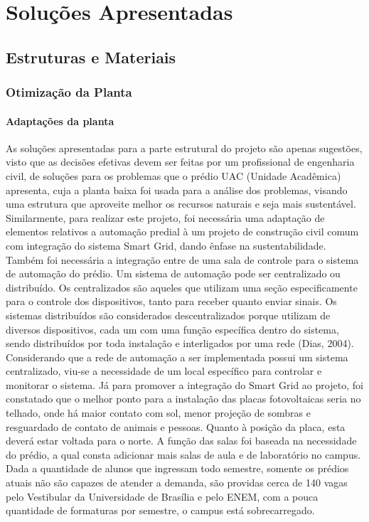 \part{Soluções Apresentadas}
\label{sol}
\chapter[Estruturas e Materiais]{Estruturas e Materiais}

\section{Otimização da Planta}
\subsection{Adaptações da planta}
As soluções apresentadas para a parte estrutural do projeto são apenas sugestões, visto que as decisões efetivas devem ser feitas por um profissional de engenharia civil, de soluções para os problemas que o prédio UAC (Unidade Acadêmica) apresenta, cuja a planta baixa foi usada para a análise dos problemas, visando uma estrutura que aproveite melhor os recursos naturais e seja mais sustentável.
Similarmente, para realizar este projeto, foi necessária uma adaptação de elementos relativos a automação predial à um projeto de construção civil comum com integração do sistema Smart Grid, dando ênfase na sustentabilidade. Também foi necessária a integração entre de uma sala de controle para o sistema de automação do prédio.
Um sistema de automação pode ser centralizado ou distribuído. Os centralizados são aqueles que utilizam uma seção especificamente para o controle dos dispositivos, tanto para receber quanto enviar sinais. Os sistemas distribuídos são considerados descentralizados porque utilizam de diversos dispositivos, cada um com uma função específica dentro do sistema, sendo distribuídos por toda instalação e interligados por uma rede (Dias, 2004).
Considerando que a rede de automação a ser implementada possui um sistema centralizado, viu-se a necessidade de um local específico para controlar e monitorar o sistema. Já para promover a integração do Smart Grid ao projeto, foi constatado que o melhor ponto para a instalação das placas fotovoltaicas seria no telhado, onde há maior contato com sol, menor projeção de sombras e resguardado de contato de animais e pessoas. Quanto à posição da placa, esta deverá estar voltada para o norte.
A função das salas foi baseada na necessidade do prédio, a qual consta adicionar mais salas de aula e de laboratório no campus. Dada a quantidade de alunos que ingressam todo semestre, somente os prédios atuais não são capazes de atender a demanda, são providas cerca de 140 vagas pelo Vestibular da Universidade de Brasília e pelo ENEM, com a pouca quantidade de formaturas por semestre, o campus está sobrecarregado.
